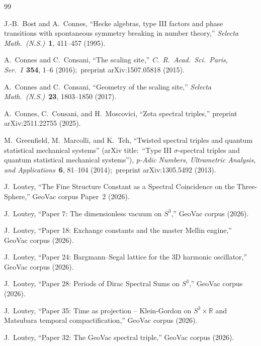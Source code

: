 \documentclass[11pt,a4paper]{article}
\theoremstyle{plain}
\theoremstyle{definition}
\newcommand{\sthree}{S^{3}}
\newcommand{\R}{\mathbb{R}}
\begin{document}
\begin{thebibliography}{99}

J.-B.~Bost and A.~Connes, ``Hecke algebras, type III factors and
phase transitions with spontaneous symmetry breaking in number
theory,'' \textit{Selecta Math.~(N.S.)}~\textbf{1}, 411--457 (1995).

A.~Connes and C.~Consani, ``The scaling site,''
\textit{C.\ R.\ Acad.\ Sci.\ Paris, Ser.~I}~\textbf{354}, 1--6
(2016);\ preprint arXiv:1507.05818 (2015).

A.~Connes and C.~Consani, ``Geometry of the scaling site,''
\textit{Selecta Math.~(N.S.)}~\textbf{23}, 1803--1850 (2017).

A.~Connes, C.~Consani, and H.~Moscovici, ``Zeta spectral triples,''
preprint arXiv:2511.22755 (2025).

M.~Greenfield, M.~Marcolli, and K.~Teh, ``Twisted spectral triples
and quantum statistical mechanical systems'' (arXiv title:\ ``Type III
$\sigma$-spectral triples and quantum statistical mechanical
systems''), \textit{p-Adic
Numbers, Ultrametric Analysis, and Applications}~\textbf{6},
81--104 (2014);\ preprint arXiv:1305.5492 (2013).

J.~Loutey, ``The Fine Structure Constant as a Spectral Coincidence on
the Three-Sphere,'' GeoVac corpus Paper~2 (2026).

J.~Loutey, ``Paper 7: The dimensionless vacuum on $\sthree$,'' GeoVac
corpus (2026).

J.~Loutey, ``Paper 18: Exchange constants and the master Mellin
engine,'' GeoVac corpus (2026).

J.~Loutey, ``Paper 24: Bargmann--Segal lattice for the 3D harmonic
oscillator,'' GeoVac corpus (2026).

J.~Loutey, ``Paper 28: Periods of Dirac Spectral Sums on $\sthree$,'' GeoVac corpus (2026).

J.~Loutey, ``Paper 35: Time as projection -- Klein-Gordon on
$\sthree \times \R$ and Matsubara temporal compactification,''
GeoVac corpus (2026).

J.~Loutey, ``Paper 32: The GeoVac spectral triple,'' GeoVac corpus
(2026).


\end{thebibliography}
\end{document}
